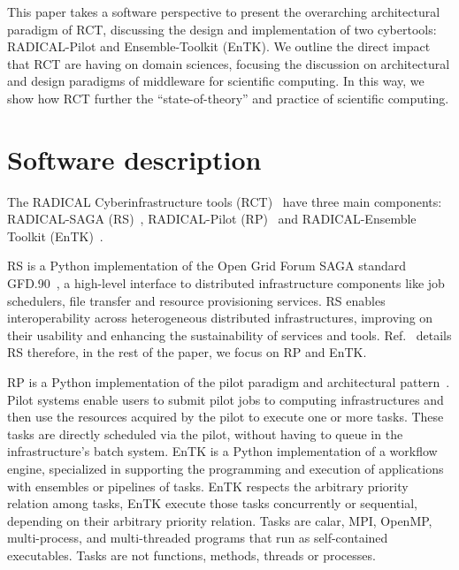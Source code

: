 \documentclass[preprint,12pt, a4paper]{elsarticle}
\begin{document}
This paper takes a software perspective to present the overarching
architectural paradigm of RCT, discussing the design and implementation of
two cybertools: RADICAL-Pilot and Ensemble-Toolkit (EnTK). We outline the
direct impact that RCT are having on domain sciences, focusing the discussion
on architectural and design paradigms of middleware for scientific computing.
In this way, we show how RCT further the ``state-of-theory'' and practice of
scientific computing.


\section{Software description}\label{sec:description}


The RADICAL Cyberinfrastructure tools (RCT)~\cite{github-rct} have three main
components: RADICAL-SAGA (RS)~\cite{merzky2015saga}, RADICAL-Pilot
(RP)~\cite{merzky2018using} and RADICAL-Ensemble Toolkit
(EnTK)~\cite{entk,balasubramanian2018harnessing}.

RS is a Python implementation of the Open Grid Forum SAGA standard
GFD.90~\cite{goodale2006saga}, a high-level interface to distributed
infrastructure components like job schedulers, file transfer and resource
provisioning services. RS enables interoperability across heterogeneous
distributed infrastructures, improving on their usability and enhancing the
sustainability of services and tools. Ref.~\cite{merzky2015saga} details RS
therefore, in the rest of the paper, we focus on RP and EnTK.

RP is a Python implementation of the pilot paradigm and architectural
pattern~\cite{turilli2018comprehensive}. Pilot systems enable users to submit
pilot jobs to computing infrastructures and then use the resources acquired
by the pilot to execute one or more tasks. These tasks are directly scheduled
via the pilot, without having to queue in the infrastructure's batch system.
EnTK is a Python implementation of a workflow engine, specialized in
supporting the programming and execution of applications with ensembles or
pipelines of tasks. EnTK respects the arbitrary priority relation among
tasks, EnTK execute those tasks concurrently or sequential, depending on
their arbitrary priority relation. Tasks are calar, MPI, OpenMP,
multi-process, and multi-threaded  programs that run as self-contained
executables. Tasks are not functions, methods, threads or processes.
\end{document}

